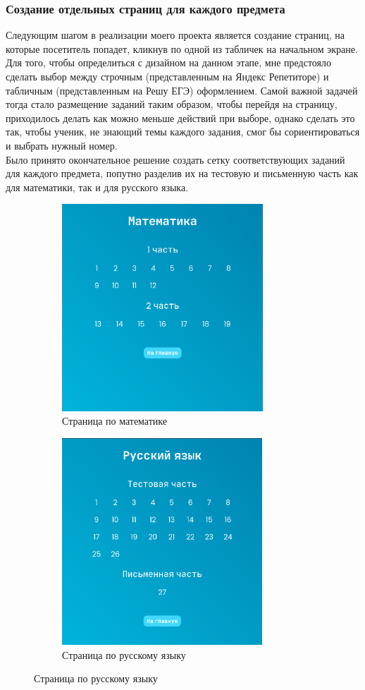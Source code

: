 \documentclass[a4paper, 12pt]{extarticle}
\begin{document}
\subsubsection{Создание отдельных страниц для каждого предмета}
Следующим шагом в реализации моего проекта является создание страниц, на
которые посетитель попадет, кликнув по одной из табличек на начальном экране.
Для того, чтобы определиться с дизайном на данном этапе, мне предстояло сделать
выбор между строчным (представленным на Яндекс Репетиторе) и табличным
(представленным на Решу ЕГЭ) оформлением. Самой важной задачей тогда стало
размещение заданий таким образом, чтобы перейдя на страницу, приходилось делать
как можно меньше действий при выборе, однако сделать это так, чтобы ученик, не
знающий темы каждого задания, смог бы сориентироваться и выбрать нужный номер.
\\

Было принято окончательное решение создать сетку соответствующих заданий для
каждого предмета, попутно разделив их на тестовую и письменную часть как для
математики, так и для русского языка.

\begin{figure}[h]
    \begin{subfigure}{.5\textwidth}
        \centering
        \includegraphics[height=220pt]{./img/math.png}
        \caption{Страница по математике}
    \end{subfigure}
    \begin{subfigure}{.5\textwidth}
        \centering
        \includegraphics[height=220pt]{./img/russian.png}
        \caption{Страница по русскому языку}
    \end{subfigure}
\end{figure}
\end{document}
